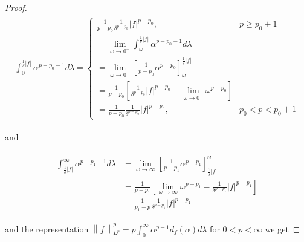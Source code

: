 \begin{proof}
\begin{gather}
	\begin{aligned}
		\int_0^{\frac{1}{\delta}\left| f\right|}\alpha^{p-p_0-1} d\lambda = 
			\begin{cases}
				\frac{1}{p-p_0}\frac{1}{\delta^{p-p_0}}\left| f \right|^{p - p_0}, & p \geqslant p_0 + 1\\
				=\lim_{\omega \to 0^+} \int_\omega^{\frac{1}{\delta}\left| f\right|}\alpha^{p-p_0-1} d\lambda\\
				= \lim_{\omega \to 0^+}\left[\frac{1}{p-p_0}\alpha^{p - p_0}\right]_\omega^{\frac{1}{\delta}\left| f\right|}\\
				= \frac{1}{p-p_0}\left[\frac{1}{\delta^{p-p_0}}\left| f \right|^{p - p_0} - \lim_{\omega \to 0^+} \omega^{p-p_0}\right]\\
				= \frac{1}{p-p_0}\frac{1}{\delta^{p-p_0}} \left| f\right|^{p - p_0}, & p_0 < p < p_0 + 1
			\end{cases}
	\end{aligned}
\end{gather}

and

\begin{gather}
	\begin{aligned}
		\int_{\frac{1}{\delta}\left| f\right|}^{\infty}\alpha^{p-p_1-1} d\lambda &= \lim_{\omega \to \infty} \left[ \frac{1}{p - p_1} \alpha^{p - p_1}\right]^\omega_{\frac{1}{\delta}\left| f\right|}\\
		&= \frac{1}{p - p_1} \left[ \lim_{\omega \to \infty} \omega^{p - p_1} - \frac{1}{\delta^{p - p_1}} \left| f\right|^{p - p_1}\right]\\
		&= \frac{1}{p_1 - p}\frac{1}{\delta^{p-p_1}} \left| f \right|^{p - p_1}
	\end{aligned}
\end{gather}

and the representation $\displaystyle \left\|f\right\|^p_{L^p} = p \int_0^{\infty} \alpha^{p-1}d_f(\alpha) d\lambda$ for $ 0 < p < \infty$ we get


\end{proof}
